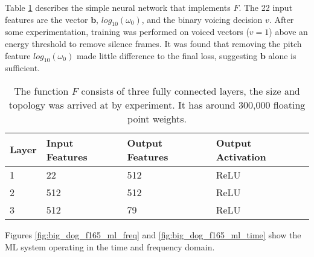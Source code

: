 \documentclass{article}
\begin{document}
Table \ref{tab:ml_network} describes the simple neural network that implements $F$.  The 22 input features are the vector $\mathbf{b}$, $log_{10}(\omega_0)$, and the binary voicing decision $v$. After some experimentation, training was performed on voiced vectors ($v=1$) above an energy threshold to remove silence frames.  It was found that removing the pitch feature $log_{10}(\omega_0)$ made little difference to the final loss, suggesting $\mathbf{b}$ alone is sufficient.  

\begin{table}[H]
\label{tab:ml_network}
\centering
\begin{tabular}{l l l l}
\hline
Layer & Input Features & Output Features & Output Activation \\
\hline
1 & 22 & 512 & ReLU  \\
2 & 512 & 512 & ReLU  \\
3 & 512 & 79 & ReLU  \\
\hline
\end{tabular}
\caption{The function $F$ consists of three fully connected layers, the size and topology was arrived at by experiment. It has around 300,000 floating point weights.}
\end{table}

Figures \ref{fig:big_dog_f165_ml_freq} and \ref{fig:big_dog_f165_ml_time} show the ML system operating in the time and frequency domain.
\end{document}

